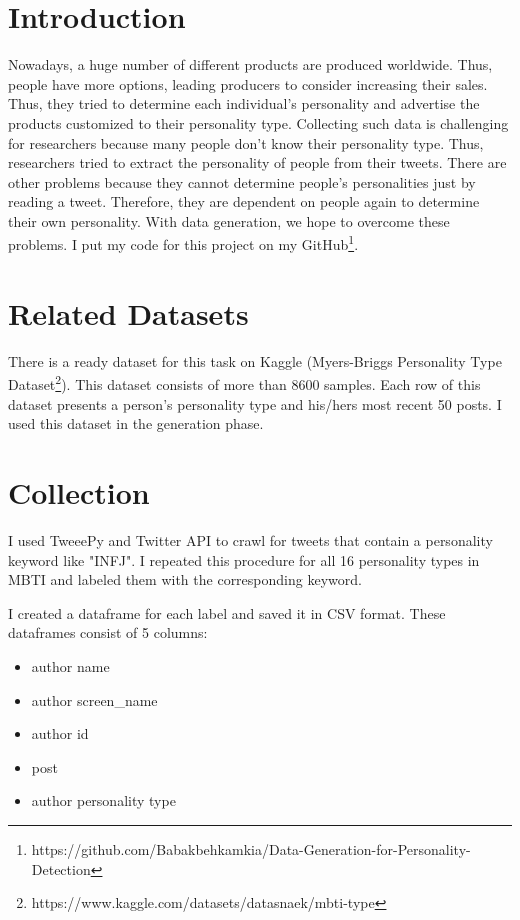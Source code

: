 \section{Introduction}
Nowadays, a huge number of different products are produced worldwide. Thus, people have more options, leading producers to consider increasing their sales. Thus, they tried to determine each individual's personality and advertise the products customized to their personality type. 
Collecting such data is challenging for researchers because many people don't know their personality type. Thus, researchers tried to extract the personality of people from their tweets. There are other problems because they cannot determine people's personalities just by reading a tweet. Therefore, they are dependent on people again to determine their own personality.
With data generation, we hope to overcome these problems. I put my code for this project on my GitHub\footnote{https://github.com/Babakbehkamkia/Data-Generation-for-Personality-Detection}.



\section{Related Datasets}
There is a ready dataset for this task on Kaggle (Myers-Briggs Personality Type Dataset\footnote{https://www.kaggle.com/datasets/datasnaek/mbti-type}). This dataset consists of more than 8600 samples. Each row of this dataset presents a person's personality type and his/hers most recent 50 posts. I used this dataset in the generation phase.

\section{Collection}
I used TweeePy and Twitter API to crawl for tweets that contain a personality keyword like "INFJ". I repeated this procedure for all 16 personality types in MBTI and labeled them with the corresponding keyword.

I created a dataframe for each label and saved it in CSV format. These dataframes consist of 5 columns:
\begin{itemize}
    \item author name
    \item author screen\_name
    \item author id
    \item post
    \item author personality type
\end{itemize}

